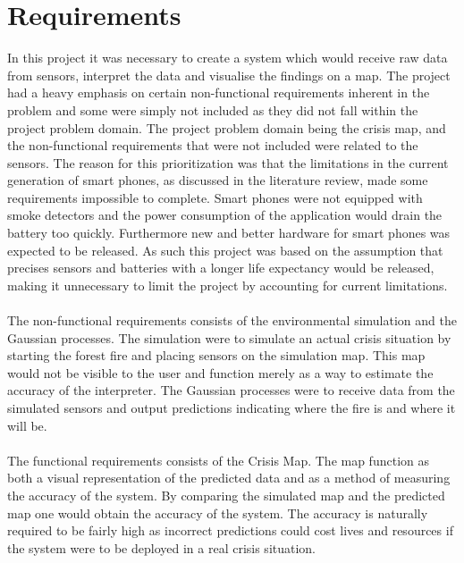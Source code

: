 \section{Requirements}
In this project it was necessary to create a system which would receive raw data from sensors, interpret the data and visualise the findings on a map. The project had a heavy emphasis on certain non-functional requirements inherent in the problem and some were simply not included as they did not fall within the project problem domain. The project problem domain being the crisis map, and the non-functional requirements that were not included were related to the sensors. The reason for this prioritization was that the limitations in the current generation of smart phones, as discussed in the literature review, made some requirements impossible to complete. Smart phones were not equipped with smoke detectors and the power consumption of the application would drain the battery too quickly. Furthermore new and better hardware for smart phones was expected to be released. As such this project was based on the assumption that precises sensors and batteries with a longer life expectancy would be released, making it unnecessary to limit the project by accounting for current limitations.
\\\\
The non-functional requirements consists of the environmental simulation and the Gaussian processes. The simulation were to simulate an actual crisis situation by starting the forest fire and placing sensors on the simulation map. This map would not be visible to the user and function merely as a way to estimate the accuracy of the interpreter. The Gaussian processes were to receive data from the simulated sensors and output predictions indicating where the fire is and where it will be.
\\\\
The functional requirements consists of the Crisis Map. The map function as both a visual representation of the predicted data and as a method of measuring the accuracy of the system. By comparing the simulated map and the predicted map one would obtain the accuracy of the system. The accuracy is naturally required to be fairly high as incorrect predictions could cost lives and resources if the system were to be deployed in a real crisis situation.